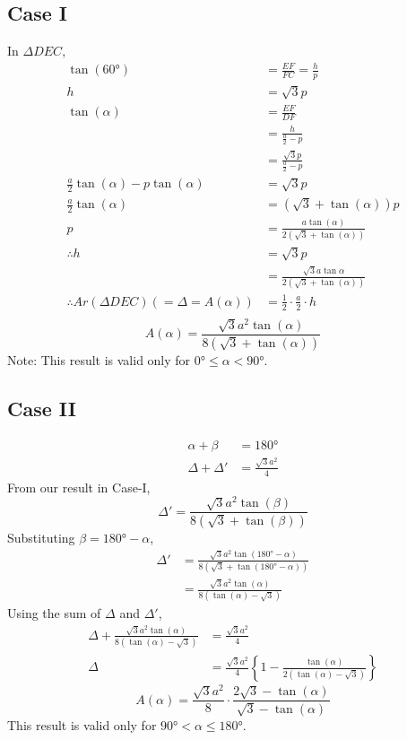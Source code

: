 \documentclass{article}
\begin{document}
\subsection*{Case I}
In $\Delta DEC$,
\begin{align*}
    \tan(\ang{60})&=\frac{EF}{FC}=\frac{h}{p} \\
    h&=\sqrt{3}p \\
    \tan(\alpha)&=\frac{EF}{DF} \\
                &=\frac{h}{\frac{a}{2}-p} \\
                &=\frac{\sqrt{3}p}{\frac{a}{2}-p} \\
    \frac{a}{2}\tan(\alpha)-p\tan(\alpha)&=\sqrt{3}p \\
    \frac{a}{2}\tan(\alpha)&=(\sqrt{3}+\tan(\alpha))p \\
    p&=\frac{a \tan(\alpha)}{2(\sqrt{3}+\tan(\alpha))} \\
    \therefore h&= \sqrt{3}p \\
                &= \frac{\sqrt{3}a \tan{\alpha}}{2(\sqrt{3}+\tan(\alpha))} \\
    \therefore Ar(\Delta DEC) (=\Delta = A(\alpha)) &= \frac{1}{2} \cdot \frac{a}{2} \cdot h \\
\end{align*}
\[\boxed{A(\alpha)=\frac{\sqrt{3} a^{2} \tan(\alpha)}{8 (\sqrt{3}+\tan(\alpha))}}\]
Note: This result is valid only for $\ang{0} \leq \alpha < \ang{90}$.
\subsection*{Case II}
\begin{align*}
    \alpha + \beta &= \ang{180} \\
    \Delta + \Delta' &= \frac{\sqrt{3}a^{2}}{4}
\end{align*}
From our result in Case-I,
\[\Delta' = \frac{\sqrt{3} a^2 \tan(\beta)}{8(\sqrt{3}+\tan(\beta))}\]
Substituting $\beta = \ang{180} - \alpha$,
\begin{align*}
    \Delta' &= \frac{\sqrt{3}a^{2}\tan(\ang{180}-\alpha)}{8(\sqrt{3}+\tan(\ang{180}-\alpha))} \\
            &= \frac{\sqrt{3}a^{2}\tan(\alpha)}{8(\tan(\alpha)-\sqrt{3})}
\end{align*}
Using the sum of $\Delta$ and $\Delta'$,
\begin{align*}
    \Delta + \frac{\sqrt{3}a^{2}\tan(\alpha)}{8(\tan(\alpha)-\sqrt{3})} &= \frac{\sqrt{3}a^{2}}{4} \\
    \Delta &= \frac{\sqrt{3}a^2}{4}\left\{1-\frac{\tan(\alpha)}{2(\tan(\alpha)-\sqrt{3})}\right\}
\end{align*}
\[\boxed{A(\alpha)=\frac{\sqrt{3}a^2}{8}\cdot \frac{2\sqrt{3}-\tan(\alpha)}{\sqrt{3}-\tan(\alpha)}}\]
This result is valid only for $\ang{90} < \alpha \leq \ang{180}$.
\medskip
\end{document}
